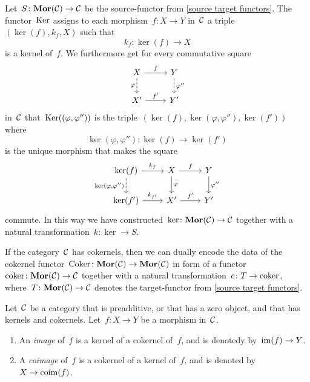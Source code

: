 \begin{remark*}
\begin{enumerate}
      Let~$S \colon \mathbf{Mor}(\mathcal{C}) \to \mathcal{C}$ be the source-functor from \cref{source target functors}.
      The functor~$\operatorname{Ker}$ assigns to each morphism~$f \colon X \to Y$ in~$\mathcal{C}$ a triple~$(\ker(f), k_f, X)$ such that
      \[
                k_f
        \colon  \ker(f)
        \to     X
      \]
      is a kernel of~$f$.
      We furthermore get for every commutative square
      \[
        \begin{tikzcd}
            X
            \arrow{r}[above]{f}
            \arrow[dashed]{d}[left]{\varphi}
          & Y
            \arrow[dashed]{d}[right]{\varphi''}
          \\
            X'
            \arrow{r}[above]{f'}
          & Y'
        \end{tikzcd}
      \]
      in~$\mathcal{C}$ that~$\operatorname{Ker}((\varphi,\varphi''))$ is the triple~$(\ker(f), \ker(\varphi,\varphi''), \ker(f'))$ where
      \[
                \ker(\varphi, \varphi'')
        \colon  \ker(f)
        \to     \ker(f')
      \]
      is the unique morphism that makes the square
      \[
        \begin{tikzcd}
            \ker(f)
            \arrow{r}[above]{k_f}
            \arrow[dashed]{d}[left]{\ker(\varphi, \varphi'')}
          & X
            \arrow{r}[above]{f}
            \arrow{d}[right]{\varphi}
          & Y
            \arrow{d}[right]{\varphi''}
          \\
            \ker(f')
            \arrow{r}[above]{k_{f'}}
          & X'
            \arrow{r}[above]{f'}
          & Y'
        \end{tikzcd}
      \]
      commute.
      In this way we have constructed~$\ker \colon \mathbf{Mor}(\mathcal{C}) \to \mathcal{C}$ together with a natural transformation~$k \colon \ker \to S$.
      
      If the category~$\mathcal{C}$ has cokernels, then we can dually encode the data of the cokernel functor~$\operatorname{Coker} \colon \mathbf{Mor}(\mathcal{C}) \to \mathbf{Mor}(\mathcal{C})$ in form of a functor~$\operatorname{coker} \colon \mathbf{Mor}(\mathcal{C}) \to \mathcal{C}$ together with a natural transformation~$c \colon T \to \operatorname{coker}$, where~$T \colon \mathbf{Mor}(\mathcal{C}) \to \mathcal{C}$ denotes the target-functor from \cref{source target functors}.
  \end{enumerate}
\end{remark*}


\begin{definition}
  Let~$\mathcal{C}$ be a category that is preadditive, or that has a zero object, and that has kernels and cokernels.
  Let~$f \colon X \to Y$ be a morphism in~$\mathcal{C}$.
  \begin{enumerate}
    \item
      An \emph{image} of~$f$ is a kernel of a cokernel of~$f$, and is denotedy by~$\operatorname{im}(f) \to Y$.
    \item
      A \emph{coimage} of~$f$ is a cokernel of a kernel of~$f$, and is denoted by~$X \to \operatorname{coim}(f)$.
  \end{enumerate}
\end{definition}


